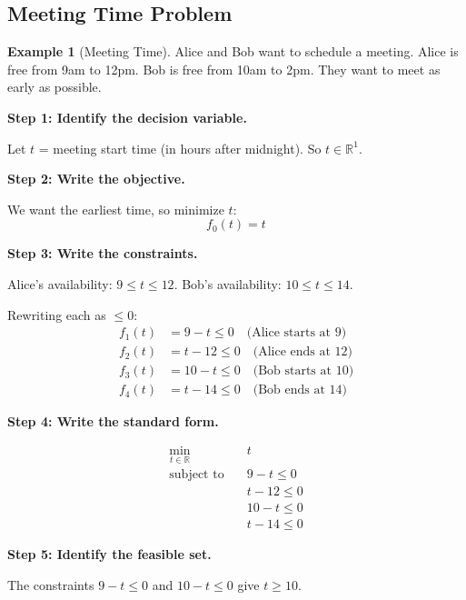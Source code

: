 \documentclass[10pt, twocolumn]{article}
\theoremstyle{definition}
\newtheorem{example}{Example}
\theoremstyle{plain}
\newcommand{\RR}{\mathbb{R}}
\begin{document}
\subsection{Meeting Time Problem}

\begin{example}[Meeting Time]
Alice and Bob want to schedule a meeting. Alice is free from 9am to 12pm. Bob is free from 10am to 2pm. They want to meet as early as possible.
\end{example}

\textbf{Step 1: Identify the decision variable.}

Let $t$ = meeting start time (in hours after midnight). So $t \in \RR^1$.

\textbf{Step 2: Write the objective.}

We want the earliest time, so minimize $t$:
\[
    f_0(t) = t
\]

\textbf{Step 3: Write the constraints.}

Alice's availability: $9 \le t \le 12$. Bob's availability: $10 \le t \le 14$.

Rewriting each as $\le 0$:
\begin{align*}
    f_1(t) &= 9 - t \le 0 \quad \text{(Alice starts at 9)} \\
    f_2(t) &= t - 12 \le 0 \quad \text{(Alice ends at 12)} \\
    f_3(t) &= 10 - t \le 0 \quad \text{(Bob starts at 10)} \\
    f_4(t) &= t - 14 \le 0 \quad \text{(Bob ends at 14)}
\end{align*}

\textbf{Step 4: Write the standard form.}

\begin{result}
\[
\begin{aligned}
    \min_{t \in \RR} \quad & t \\
    \text{subject to} \quad & 9 - t \le 0 \\
    & t - 12 \le 0 \\
    & 10 - t \le 0 \\
    & t - 14 \le 0
\end{aligned}
\]
\end{result}

\textbf{Step 5: Identify the feasible set.}

The constraints $9 - t \le 0$ and $10 - t \le 0$ give $t \ge 10$.
\end{document}
